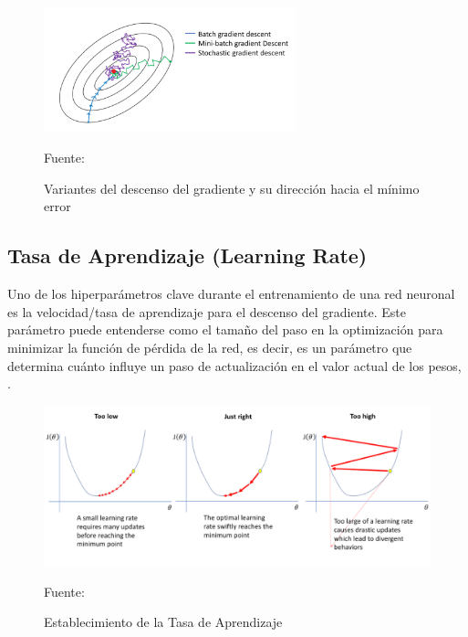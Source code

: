 			\begin{figure}[H]
			\begin{center}
			\includegraphics[width=0.65\textwidth]{images/desarrollo/gradientDescent}
			\end{center}
			\begin{center}
			\caption{\small{Variantes del descenso del gradiente y su dirección hacia el mínimo error}}
			\vspace{-0.5em}
			{\small{Fuente: \cite{Imad}}}
			\end{center}
			\vspace{-1.5em}
			\end{figure}


	\subsection{Tasa de Aprendizaje (Learning Rate)}
		Uno de los hiperparámetros clave durante el entrenamiento de una red neuronal es la velocidad/tasa de aprendizaje para el descenso del gradiente.
		Este parámetro puede entenderse como el tamaño del paso en la optimización para minimizar la función de pérdida de la red, es decir, es un parámetro que determina cuánto influye un paso de actualización en el valor actual de los pesos, \citep {AdamImg}. %

		\begin{figure}[H]
		\includegraphics[width=1\textwidth]{images/desarrollo/entrenamiento/LR}
		\begin{center}
		\caption{\small{Establecimiento de la Tasa de Aprendizaje}}
		\vspace{-0.5em}
		{\small{Fuente: \cite{AdamImg}}}
		\end{center}
		\vspace{-1.5em}
		\end{figure}

